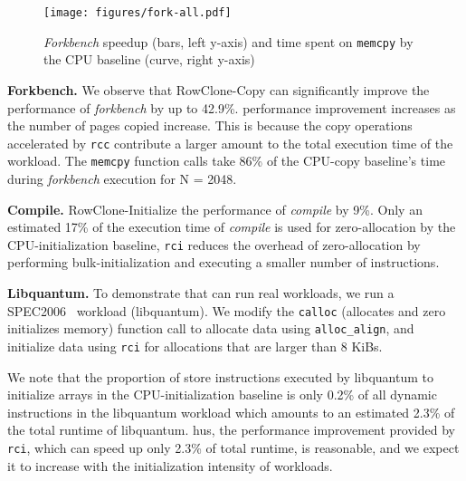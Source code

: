 \begin{figure}[!h]
    \centering
    \texttt{[image: figures/fork-all.pdf]}
    \caption{\emph{Forkbench} speedup (bars, left y-axis) and time spent on \texttt{memcpy} by the CPU baseline (curve, right y-axis)}
    \label{fig:fork-all}
\end{figure}

\noindent
{\textbf{Forkbench.}} {We observe that RowClone-Copy can significantly improve the performance of \emph{forkbench} by up to {42.9}\%.  performance improvement increases as the number of pages copied increase. This is because the copy operations accelerated by \texttt{rcc} contribute a larger amount to the total execution time of the workload. The \texttt{memcpy} function calls take {86\%} of the CPU-copy baseline's time during \emph{forkbench} execution for N = {2048}.}

\noindent
{\textbf{Compile.}} {RowClone-Initialize  the performance of \emph{compile} by 9\%. Only an estimated 17\% of the execution time of \emph{compile} is used for zero-allocation by the CPU-initialization baseline, \texttt{rci} reduces the overhead of zero-allocation by  performing  bulk-initialization and  executing a smaller number of instructions.}

\noindent
{\textbf{Libquantum.} To demonstrate that \X can run real workloads, we run a SPEC2006~\cite{spec2006} workload (libquantum). We modify the \texttt{calloc} (allocates and zero initializes memory) function call to allocate data using \texttt{alloc\_align}, and initialize data using \texttt{rci} for allocations that are larger than 8 KiBs.}

 {We note that the proportion of store instructions executed by libquantum to initialize arrays in the CPU-initialization baseline is only 0.2\% of all dynamic instructions in the libquantum workload {which amounts to an estimated 2.3\% of the total runtime of libquantum.} hus, the  performance improvement provided by \texttt{rci}, which can  speed up only 2.3\% of  total runtime, is reasonable, and we expect it to increase with the initialization intensity of workloads.}

